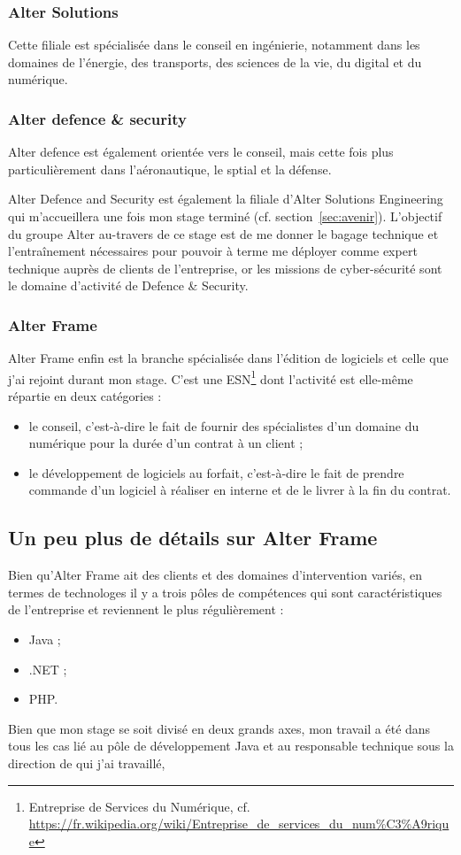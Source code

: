\subsubsection{Alter Solutions}
Cette filiale est spécialisée dans le conseil en ingénierie, notamment dans les domaines de l'énergie, des transports, des sciences de la vie, du digital et du numérique.

\subsubsection{Alter defence \& security}
Alter defence est également orientée vers le conseil, mais cette fois plus particulièrement dans l'aéronautique, le sptial et la défense.

Alter Defence and Security est également la filiale d'Alter Solutions Engineering qui m'accueillera une fois mon stage terminé (cf. section~\ref{sec:avenir}). L'objectif du groupe Alter au-travers de ce stage est de me donner le bagage technique et l'entraînement nécessaires pour pouvoir à terme me déployer comme expert technique auprès de clients de l'entreprise, or les missions de cyber-sécurité sont le domaine d'activité de Defence \& Security.

\subsubsection{Alter Frame}
Alter Frame enfin est la branche spécialisée dans l'édition de logiciels et celle que j'ai rejoint durant mon stage. C'est une ESN\footnote{Entreprise de Services du Numérique, cf. \url{https://fr.wikipedia.org/wiki/Entreprise_de_services_du_num\%C3\%A9rique}} dont l'activité est elle-même répartie en deux catégories :
\begin{itemize}[label=$\bullet$]
\item le conseil, c'est-à-dire le fait de fournir des spécialistes d'un domaine du numérique pour la durée d'un contrat à un client ;
\item le développement de logiciels au forfait, c'est-à-dire le fait de prendre commande d'un logiciel à réaliser en interne et de le livrer à la fin du contrat.
\end{itemize}

\subsection{Un peu plus de détails sur Alter Frame}
\label{subsec:frame}
Bien qu'Alter Frame ait des clients et des domaines d'intervention variés, en termes de technologes il y a trois pôles de compétences qui sont caractéristiques de l'entreprise et reviennent le plus régulièrement :
\begin{itemize}[label=$\bullet$]
\item Java ;
\item .NET ;
\item PHP.
\end{itemize}

Bien que mon stage se soit divisé en deux grands axes, mon travail a été dans tous les cas lié au pôle de développement Java et au responsable technique sous la direction de qui j'ai travaillé, 